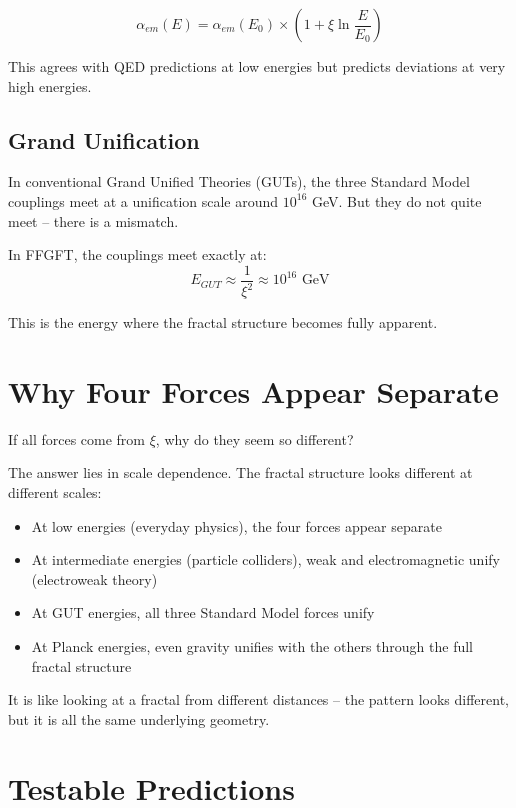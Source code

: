 \begin{equation}
\alpha_{em}(E) = \alpha_{em}(E_0) \times \left(1 + \xi \ln\frac{E}{E_0}\right)
\end{equation}

This agrees with QED predictions at low energies but predicts deviations at very high energies.

\subsection{Grand Unification}

In conventional Grand Unified Theories (GUTs), the three Standard Model couplings meet at a unification scale around $10^{16}$ GeV. But they do not quite meet -- there is a mismatch.

In FFGFT, the couplings meet exactly at:
\begin{equation}
E_{GUT} \approx \frac{1}{\xi^2} \approx 10^{16} \text{ GeV}
\end{equation}

This is the energy where the fractal structure becomes fully apparent.

\section{Why Four Forces Appear Separate}

If all forces come from $\xi$, why do they seem so different?

The answer lies in scale dependence. The fractal structure looks different at different scales:
\begin{itemize}[leftmargin=*]
\item At low energies (everyday physics), the four forces appear separate
\item At intermediate energies (particle colliders), weak and electromagnetic unify (electroweak theory)
\item At GUT energies, all three Standard Model forces unify
\item At Planck energies, even gravity unifies with the others through the full fractal structure
\end{itemize}

It is like looking at a fractal from different distances -- the pattern looks different, but it is all the same underlying geometry.

\section{Testable Predictions}


